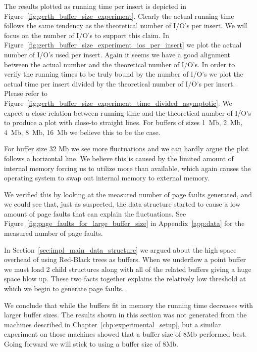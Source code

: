 \documentclass[twoside,11pt,openright]{report}
\begin{document}
The results plotted as running time per insert is depicted in Figure~\ref{fig:gerth_buffer_size_experiment}. Clearly the actual running time follows the same tendency as the theoretical number of I/O's per insert. We will focus on the number of I/O's to support this claim. In Figure~\ref{fig:gerth_buffer_size_experiment_ios_per_insert} we plot the actual number of I/O's used per insert. Again it seems we have a good alignment between the actual number and the theoretical number of I/O's. In order to verify the running times to be truly bound by the number of I/O's we plot the actual time per insert divided by the theoretical number of I/O's per insert. Please refer to Figure~\ref{fig:gerth_buffer_size_experiment_time_divided_asymptotic}. We expect a close relation between running time and the theoretical number of I/O's to produce a plot with close-to straight lines. For buffers of sizes 1~Mb, 2~Mb, 4~Mb, 8~Mb, 16~Mb we believe this to be the case. 

For buffer size 32 Mb we see more fluctuations and we can hardly argue the plot follows a horizontal line. We believe this is caused by the limited amount of internal memory forcing us to utilize more than available, which again causes the operating system to swap out internal memory to external memory. 

We verified this by looking at the measured number of page faults generated, and we could see that, just as suspected, the data structure started to cause a low amount of page faults that can explain the fluctuations. See Figure~\ref{fig:page_faults_for_large_buffer_size} in Appendix~\ref{app:data} for the measured number of page faults.

In Section~\ref{sec:impl_main_data_structure} we argued about the high space overhead of using Red-Black trees as buffers. When we underflow a point buffer we must load 2 child structures along with all of the related buffers giving a huge space blow up. These two facts together explains the relatively low threshold at which we begin to generate page faults.

We conclude that while the buffers fit in memory the running time decreases with larger buffer sizes. The results shown in this section was not generated from the machines described in Chapter~\ref{chp:experimental_setup}, but a similar experiment on those machines showed that a buffer size of 8Mb performed best. Going forward we will stick to using a buffer size of 8Mb.
\end{document}
